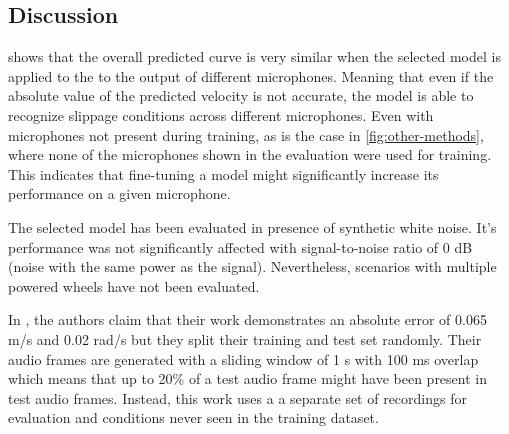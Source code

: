 \subsection{Discussion} \label{subsec:discussion}

 shows that the overall predicted curve is very similar
when the selected model is applied to the to the output of different
microphones. Meaning that even if the absolute value of the predicted velocity
is not accurate, the model is able to recognize slippage conditions across
different microphones. Even with microphones not present during training, as is
the case in \cref{fig:other-methods}, where none of the microphones shown in
the evaluation were used for training. This indicates that fine-tuning
\cite{TL2016} a model might significantly increase its performance on a given
microphone. 




The selected model has been evaluated in presence of synthetic white noise.
It's performance was not significantly affected with signal-to-noise ratio of 0
dB (noise with the same power as the signal). Nevertheless, scenarios with
multiple powered wheels have not been evaluated. 


In  \cite{marchegiani2018a}, the authors claim that
their work demonstrates an absolute error of 0.065 m/s and 0.02 rad/s but they
split their training and test set randomly. Their audio frames are generated
with a sliding window of 1 s with 100 ms overlap which means that up to 20\% of
a test audio frame might have been present in test audio frames. Instead, this
work uses a a separate set of recordings for evaluation and conditions never
seen in the training dataset.

